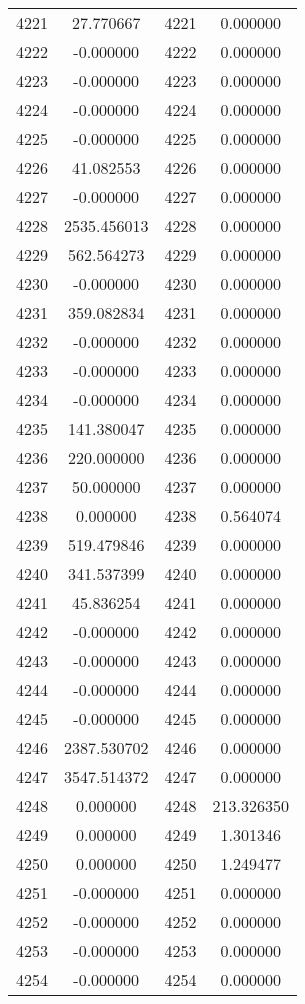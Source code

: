 \documentclass[12pt]{article}
\begin{document}
\begin{longtable}{@{}cccc@{}}
4221 & 27.770667 & 4221 & 0.000000 \\
4222 & -0.000000 & 4222 & 0.000000 \\
4223 & -0.000000 & 4223 & 0.000000 \\
4224 & -0.000000 & 4224 & 0.000000 \\
4225 & -0.000000 & 4225 & 0.000000 \\
4226 & 41.082553 & 4226 & 0.000000 \\
4227 & -0.000000 & 4227 & 0.000000 \\
4228 & 2535.456013 & 4228 & 0.000000 \\
4229 & 562.564273 & 4229 & 0.000000 \\
4230 & -0.000000 & 4230 & 0.000000 \\
4231 & 359.082834 & 4231 & 0.000000 \\
4232 & -0.000000 & 4232 & 0.000000 \\
4233 & -0.000000 & 4233 & 0.000000 \\
4234 & -0.000000 & 4234 & 0.000000 \\
4235 & 141.380047 & 4235 & 0.000000 \\
4236 & 220.000000 & 4236 & 0.000000 \\
4237 & 50.000000 & 4237 & 0.000000 \\
4238 & 0.000000 & 4238 & 0.564074 \\
4239 & 519.479846 & 4239 & 0.000000 \\
4240 & 341.537399 & 4240 & 0.000000 \\
4241 & 45.836254 & 4241 & 0.000000 \\
4242 & -0.000000 & 4242 & 0.000000 \\
4243 & -0.000000 & 4243 & 0.000000 \\
4244 & -0.000000 & 4244 & 0.000000 \\
4245 & -0.000000 & 4245 & 0.000000 \\
4246 & 2387.530702 & 4246 & 0.000000 \\
4247 & 3547.514372 & 4247 & 0.000000 \\
4248 & 0.000000 & 4248 & 213.326350 \\
4249 & 0.000000 & 4249 & 1.301346 \\
4250 & 0.000000 & 4250 & 1.249477 \\
4251 & -0.000000 & 4251 & 0.000000 \\
4252 & -0.000000 & 4252 & 0.000000 \\
4253 & -0.000000 & 4253 & 0.000000 \\
4254 & -0.000000 & 4254 & 0.000000 \\

\end{longtable}
\end{document}

